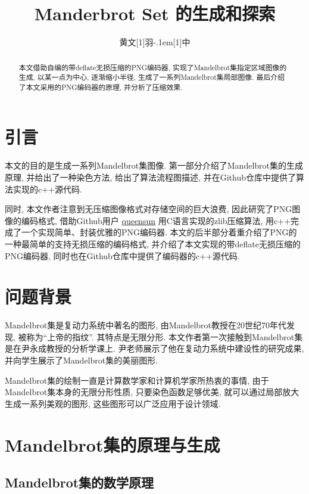 \documentclass[UTF8]{ctexart}
\title{\textbf{Manderbrot Set 的生成和探索}}
\date{}
\author{\CJKfamily{kai} 黄文\hbox{\scalebox{0.6}[1]{羽}\kern-.1em\scalebox{0.5}[1]{中}}}
\begin{document}
\maketitle

\begin{abstract}
     本文借助自编的带deflate无损压缩的PNG编码器, 实现了Mandelbrot集指定区域图像的生成, 以某一点为中心, 逐渐缩小半径, 生成了一系列Mandelbrot集局部图像. 最后介绍了本文采用的PNG编码器的原理, 并分析了压缩效果.
\end{abstract}

\section{引言}

本文的目的是生成一系列Mandelbrot集图像. 第一部分介绍了Mandelbrot集的生成原理, 并给出了一种染色方法, 给出了算法流程图描述, 并在Github仓库中提供了算法实现的c++源代码. 

同时, 本文作者注意到无压缩图像格式对存储空间的巨大浪费, 因此研究了PNG图像的编码格式, 借助Github用户 \href{https://Github.com/queensun}{queensun} 用C语言实现的zlib压缩算法, 用c++完成了一个实现简单、封装优雅的PNG编码器. 本文的后半部分着重介绍了PNG的一种最简单的支持无损压缩的编码格式, 并介绍了本文实现的带deflate无损压缩的PNG编码器, 同时也在Github仓库中提供了编码器的c++源代码. 

\section{问题背景}

Mandelbrot集是复动力系统中著名的图形, 由Mandelbrot教授在20世纪70年代发现, 被称为“上帝的指纹”. 其特点是无限分形. 本文作者第一次接触到Mandelbrot集是在尹永成教授的分析学课上. 尹老师展示了他在复动力系统中建设性的研究成果, 并向学生展示了Mandelbrot集的美丽图形. 

Mandelbrot集的绘制一直是计算数学家和计算机学家所热衷的事情, 由于Mandelbrot集本身的无限分形性质, 只要染色函数足够优美, 就可以通过局部放大生成一系列美观的图形, 这些图形可以广泛应用于设计领域. 

\section{Mandelbrot集的原理与生成}

\subsection{Mandelbrot集的数学原理}
\end{document}
